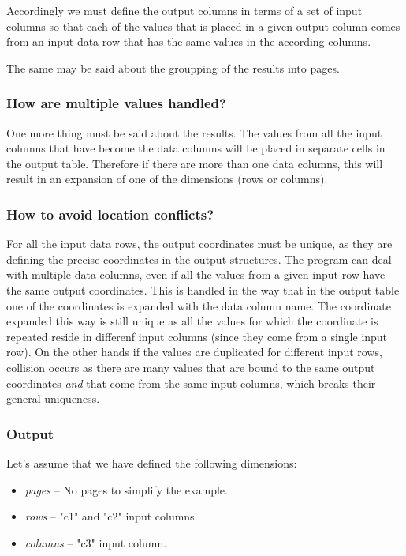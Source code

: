 \documentclass{report}
\begin{document}
Accordingly we must define the output columns in terms of a set of input columns
so that each of the values that is placed in a given output column comes from
an input data row that has the same values in the according columns.

The same may be said about the groupping of the results into pages.

\subsubsection{How are multiple values handled?}
One more thing must be said about the results. The values from all the input
columns that have become the data columns will be placed in separate cells in the
output table. Therefore if there are more than one data columns, this will result
in an expansion of one of the dimensions (rows or columns).

\subsubsection{How to avoid location conflicts?}
For all the input data rows, the output coordinates must be unique, as they are
defining the precise coordinates in the output structures. The program can deal
with multiple data columns, even if all the values from a given input row have the
same output coordinates. This is handled in the way that in the output table one
of the coordinates is expanded with the data column name. The coordinate expanded
this way is still unique as all the values for which the coordinate is repeated
reside in differenf input columns (since they come from a single input row). On
the other hands if the values are duplicated for different input rows, collision
occurs as there are many values that are bound to the same output coordinates
\textit{and} that come from the same input columns, which breaks their general
uniqueness.

\subsubsection{Output}
Let's assume that we have defined the following dimensions:
\begin{itemize}
	\item \textit{pages} -- No pages to simplify the example.
	\item \textit{rows} -- "c1" and "c2" input columns.
	\item \textit{columns} -- "c3" input column.
\end{itemize}
\end{document}
